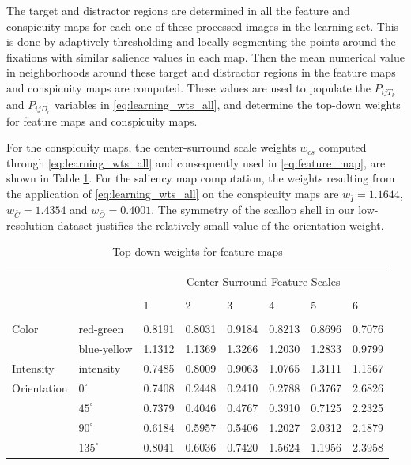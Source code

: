 \documentclass {udthesis}
\begin{document}
The target and distractor regions are determined in all the feature and conspicuity maps for each one of these processed images in the learning set.
This is done by adaptively thresholding and locally segmenting the points around the fixations with similar salience values in each map.
Then the mean numerical value in neighborhoods around  
these target and distractor regions in the feature maps and conspicuity maps 
are computed.  These values are used to populate the $P_{ijT_k}$ and $P_{ijD_r}$ variables in \eqref{eq:learning_wts_all}, and determine the top-down weights for feature maps and conspicuity maps.

For the conspicuity maps, the center-surround scale weights $w_{cs}$ computed through \eqref{eq:learning_wts_all} and consequently used in \eqref{eq:feature_map},
are shown in Table \ref{tab:tdva_fm_wts}.
For the saliency map computation, the weights resulting from the application of
\eqref{eq:learning_wts_all} on the conspicuity maps are
$w_{\bar{I}}= 1.1644$, $w_{\bar{C}}= 1.4354$ and $w_{\bar{O}}= 0.4001$.  
The symmetry of the scallop shell in our low-resolution dataset 
justifies the relatively small value of the orientation weight.

\begin{table}
\caption{Top-down weights for feature maps \label{tab:tdva_fm_wts}}
\centering
\begin{tabular}{llllllll}
\toprule[1pt]\\[-6pt]
 &   & \multicolumn{6}{c}{Center Surround Feature Scales}\\[2pt]\cline{1-8}\\[-5pt]
  &   & 1 & 2 & 3 & 4 & 5 & 6\\[2pt]\cline{1-8}\\[-5pt]
Color & red-green & 0.8191 & 0.8031 & 0.9184 & 0.8213 & 0.8696 & 0.7076\\
  & blue-yellow & 1.1312 & 1.1369 & 1.3266 & 1.2030 & 1.2833 & 0.9799\\[8pt]
Intensity & intensity & 0.7485 & 0.8009 & 0.9063 & 1.0765 & 1.3111 & 1.1567\\[8pt]
Orientation & $0^\circ$ & 0.7408 & 0.2448 & 0.2410 & 0.2788 & 0.3767 & 2.6826\\
  & $45^\circ$ & 0.7379 & 0.4046 & 0.4767 & 0.3910 & 0.7125 & 2.2325\\
  & $90^\circ$ & 0.6184 & 0.5957 & 0.5406 & 1.2027 & 2.0312 & 2.1879\\
  & $135^\circ$ & 0.8041 & 0.6036 & 0.7420 & 1.5624 & 1.1956 & 2.3958\\[2pt]\bottomrule[1pt]
\end{tabular}
\end{table}
% 
\end{document}
